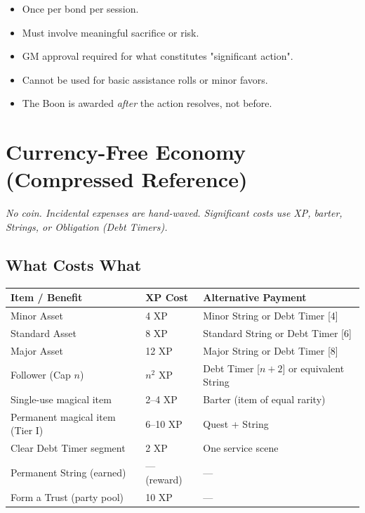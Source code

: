 \begin{itemize}
    \item Once per bond per session.
    \item Must involve meaningful sacrifice or risk.
    \item GM approval required for what constitutes "significant action".
    \item Cannot be used for basic assistance rolls or minor favors.
    \item The Boon is awarded \emph{after} the action resolves, not before.
\end{itemize}

\section{Currency-Free Economy (Compressed Reference)}
\label{sec:currency-free-ref}

\begin{tcolorbox}[colback=blue!5!white,colframe=blue!70!black,title=Quick Reference,breakable]
\emph{No coin. Incidental expenses are hand-waved. Significant costs use XP, barter, Strings, or Obligation (Debt Timers).}
\end{tcolorbox}

\subsection{What Costs What}
\label{ref:costs-table}

\begin{center}
\small
\begin{tabular}{lll}
\toprule
\textbf{Item / Benefit} & \textbf{XP Cost} & \textbf{Alternative Payment} \\
\midrule
Minor Asset & 4 XP & Minor String or Debt Timer [4] \\
Standard Asset & 8 XP & Standard String or Debt Timer [6] \\
Major Asset & 12 XP & Major String or Debt Timer [8] \\
Follower (Cap $n$) & $n^2$ XP & Debt Timer [$n+2$] or equivalent String \\
Single-use magical item & 2--4 XP & Barter (item of equal rarity) \\
Permanent magical item (Tier I) & 6--10 XP & Quest + String \\
Clear Debt Timer segment & 2 XP & One service scene \\
Permanent String (earned) & --- (reward) & --- \\
Form a Trust (party pool) & 10 XP & --- \\
\bottomrule
\end{tabular}
\end{center}

